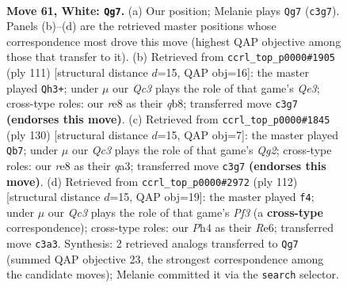 \documentclass[11pt]{article}
\begin{document}
\clearpage

\begin{figure}[p]\centering
\begin{subfigure}{0.46\textwidth}\centering
\resizebox{\linewidth}{!}{%
\newchessgame
\chessboard[
  setfen={4r3/8/1k6/6P1/4P2P/2Q5/1K6/8 w - - 7 61},
  showmover=false,
  pgfstyle=straightmove, color=movearrow, markmove={c3-g7}
]}
\caption{}
\end{subfigure}\hfill
\begin{subfigure}{0.46\textwidth}\centering
\resizebox{\linewidth}{!}{%
\newchessgame
\chessboard[
  setfen={1Q6/7K/4q3/1p1k4/8/1P6/8/8 b - - 8 56},
  showmover=false,
  pgfstyle=straightmove, color=movearrow, markmove={e6-h3}
]}
\caption{}
\end{subfigure}
\\[4pt]
\begin{subfigure}{0.46\textwidth}\centering
\resizebox{\linewidth}{!}{%
\newchessgame
\chessboard[
  setfen={7k/8/8/7p/1P6/q7/6QK/8 w - - 0 66},
  showmover=false,
  pgfstyle=straightmove, color=movearrow, markmove={g2-b7}
]}
\caption{}
\end{subfigure}\hfill
\begin{subfigure}{0.46\textwidth}\centering
\resizebox{\linewidth}{!}{%
\newchessgame
\chessboard[
  setfen={8/7k/4R3/3r3P/6K1/5P2/8/8 w - - 5 57},
  showmover=false,
  pgfstyle=straightmove, color=movearrow, markmove={f3-f4}
]}
\caption{}
\end{subfigure}
\caption{\textbf{Move 61, White: \texttt{Qg7}.} (a) Our position; Melanie plays \texttt{Qg7} (\texttt{c3g7}). Panels (b)--(d) are the retrieved master positions whose correspondence most drove this move (highest QAP objective among those that transfer to it). (b) Retrieved from \texttt{ccrl\_top\_p0000\#1905} (ply 111) [structural distance $d$=15, QAP obj=16]: the master played \texttt{Qh3+}; under $\mu$ our \emph{Qc3} plays the role of that game's \emph{Qe3}; cross-type roles: our \emph{r}e8 as their \emph{q}b8; transferred move \texttt{c3g7} \textbf{(endorses this move)}. (c) Retrieved from \texttt{ccrl\_top\_p0000\#1845} (ply 130) [structural distance $d$=15, QAP obj=7]: the master played \texttt{Qb7}; under $\mu$ our \emph{Qc3} plays the role of that game's \emph{Qg2}; cross-type roles: our \emph{r}e8 as their \emph{q}a3; transferred move \texttt{c3g7} \textbf{(endorses this move)}. (d) Retrieved from \texttt{ccrl\_top\_p0000\#2972} (ply 112) [structural distance $d$=15, QAP obj=19]: the master played \texttt{f4}; under $\mu$ our \emph{Qc3} plays the role of that game's \emph{Pf3} (a \textbf{cross-type} correspondence); cross-type roles: our \emph{P}h4 as their \emph{R}e6; transferred move \texttt{c3a3}. Synthesis: 2 retrieved analogs transferred to \texttt{Qg7} (summed QAP objective 23, the strongest correspondence among the candidate moves); Melanie committed it via the \texttt{search} selector.}
\label{fig:thought-m120}
\end{figure}
\end{document}
